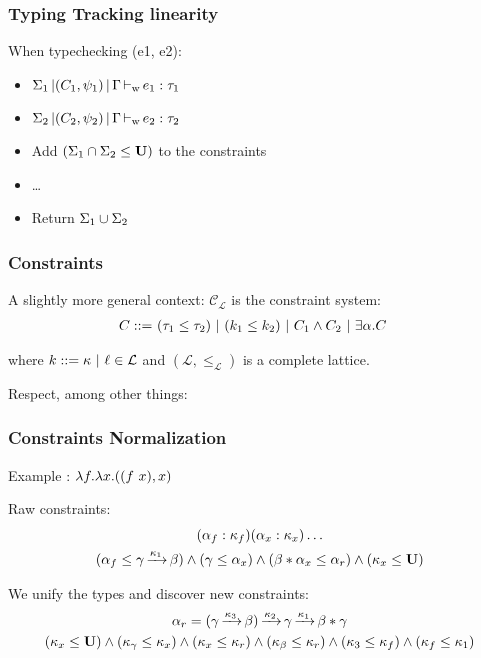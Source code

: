\documentclass[xcolor=svgnames,11pt]{beamer}
\begin{document}
\begin{frame}
  \frametitle{Typing \hfill Tracking linearity}
  
  When typechecking (e1, e2):
  \begin{itemize}[<+->]
  \item $\Sigma_1 \operatorname{|} (C_1,\psi_1) \operatorname{|} \Gamma \operatorname{\vdash_w} e_1 : \tau_1$
  \item $\Sigma_2 \operatorname{|} (C_2,\psi_2) \operatorname{|} \Gamma \operatorname{\vdash_w} e_2 : \tau_2$
  \item Add  $(\Sigma_1\cap\Sigma_2\leq \mathbf{U})$ to the constraints
  \item \dots
  \item Return $\Sigma_1\cup\Sigma_2$
  \end{itemize}

\end{frame}


\newcommand\lub\bigvee
\newcommand\glb\bigwedge
\newcommand\CL{{\mathcal C_{\mathcal L}}}

\begin{frame}
  \frametitle{Constraints}

  A slightly more general context: $\CL$ is the constraint system:
  \begin{align*}
    C ::=&\ (\tau_1 \leq \tau_2)\ |\ (k_1 \leq k_2)\ |\ C_1 \wedge C_2\ |\ \exists \alpha.C
  \end{align*}

  where $k ::=\kappa\ |\ \ell \in {\mathcal L}$ and
  $(\mathcal L, \leq_{\mathcal L})$ is a complete lattice.
  \pause

  Respect, among other things:
  
\end{frame}

\begin{frame}
  \frametitle{Constraints \hfill Normalization}

  Example : $\lambda f . \lambda x . ((f\ x),x)$

  Raw constraints:
  \begin{gather*}
    (\alpha_f : \kappa_f)
    (\alpha_x : \kappa_x)\dots\\
    (\alpha_f \leq \gamma \operatorname{\xrightarrow{\kappa_1}} \beta )
    \wedge
    (\gamma \leq \alpha_x)
    \wedge
    (\beta * \alpha_x \leq \alpha_r)
    \wedge
    (\kappa_x \leq \mathbf{U})
  \end{gather*}\pause

  We unify the types and discover new constraints:
  \begin{gather*}
    \alpha_r =
    (\gamma \operatorname{\xrightarrow{\kappa_3}} \beta) \operatorname{\xrightarrow{\kappa_2}} \gamma \operatorname{\xrightarrow{\kappa_1}} \beta * \gamma\\
    (\kappa_x \leq \mathbf{U})
    \wedge
    (\kappa_\gamma \leq \kappa_x)
    \wedge
    (\kappa_x \leq \kappa_r)
    \wedge
    (\kappa_\beta \leq \kappa_r)
    \wedge
    (\kappa_3 \leq \kappa_f)
    \wedge
    (\kappa_f \leq \kappa_1)
  \end{gather*}
\end{frame}
\end{document}
